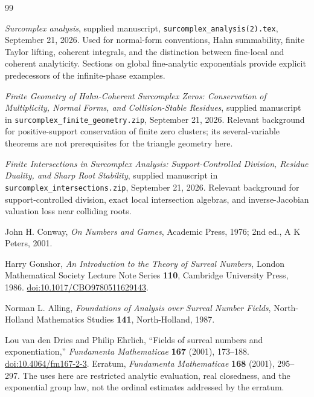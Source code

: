 \documentclass[11pt]{article}
\numberwithin{equation}{section}
\theoremstyle{definition}
\begin{document}
\begingroup
\small
\setlength{\parskip}{0pt}
\begin{thebibliography}{99}
\setlength{\itemsep}{0.35em}
\raggedright
{}

\emph{Surcomplex analysis}, supplied manuscript,
\texttt{surcomplex\_analysis(2).tex}, September 21, 2026.
Used for normal-form conventions, Hahn summability, finite Taylor lifting, coherent integrals, and the distinction between fine-local and coherent analyticity. Sections on global fine-analytic exponentials provide explicit predecessors of the infinite-phase examples.

\emph{Finite Geometry of Hahn-Coherent Surcomplex Zeros: Conservation of Multiplicity, Normal Forms, and Collision-Stable Residues}, supplied manuscript in
\texttt{surcomplex\_finite\_geometry.zip}, September 21, 2026.
Relevant background for positive-support conservation of finite zero clusters; its several-variable theorems are not prerequisites for the triangle geometry here.

\emph{Finite Intersections in Surcomplex Analysis: Support-Controlled Division, Residue Duality, and Sharp Root Stability}, supplied manuscript in
\texttt{surcomplex\_intersections.zip}, September 21, 2026.
Relevant background for support-controlled division, exact local intersection algebras, and inverse-Jacobian valuation loss near colliding roots.

John H. Conway, \emph{On Numbers and Games}, Academic Press, 1976;
2nd ed., A K Peters, 2001.

Harry Gonshor, \emph{An Introduction to the Theory of Surreal Numbers},
London Mathematical Society Lecture Note Series \textbf{110},
Cambridge University Press, 1986.
\href{https://doi.org/10.1017/CBO9780511629143}{doi:10.1017/CBO9780511629143}.

Norman L. Alling, \emph{Foundations of Analysis over Surreal Number Fields},
North-Holland Mathematics Studies \textbf{141}, North-Holland, 1987.

Lou van den Dries and Philip Ehrlich,
``Fields of surreal numbers and exponentiation,''
\emph{Fundamenta Mathematicae} \textbf{167} (2001), 173--188.
\href{https://doi.org/10.4064/fm167-2-3}{doi:10.4064/fm167-2-3}.
Erratum, \emph{Fundamenta Mathematicae} \textbf{168} (2001), 295--297.
The uses here are restricted analytic evaluation, real closedness, and the exponential group law, not the ordinal estimates addressed by the erratum.


\end{thebibliography}
\end{document}
